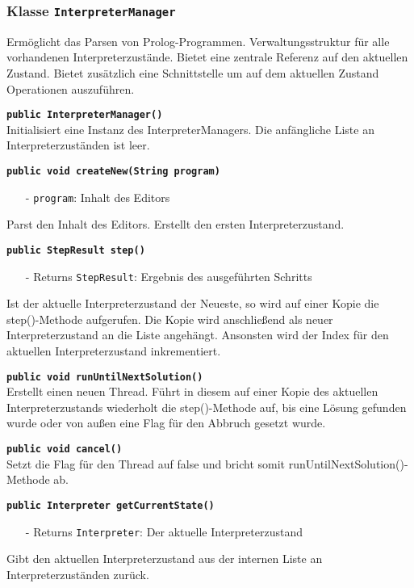 \documentclass[parskip=full,11pt,twoside]{scrartcl}
\begin{document}
\subsubsection{Klasse \texttt{InterpreterManager}}

Ermöglicht das Parsen von Prolog-Programmen. Verwaltungsstruktur für alle vorhandenen Interpreterzustände. Bietet eine zentrale Referenz auf den aktuellen Zustand. Bietet zusätzlich eine Schnittstelle um auf dem aktuellen Zustand Operationen auszuführen.

\textbf{\texttt{public InterpreterManager()}}\\
Initialisiert eine Instanz des InterpreterManagers. Die anfängliche Liste an Interpreterzuständen ist leer.

\textbf{\texttt{public void createNew(String program)}}
\begin{itemize}[noitemsep]
	\item[-] \texttt{program}: Inhalt des Editors
\end{itemize}
Parst den Inhalt des Editors. Erstellt den ersten Interpreterzustand.

\textbf{\texttt{public StepResult step()}}
\begin{itemize}[noitemsep]
    \item[-] Returns \texttt{StepResult}: Ergebnis des ausgeführten Schritts
\end{itemize}
Ist der aktuelle Interpreterzustand der Neueste, so wird auf einer Kopie die step()-Methode aufgerufen. Die Kopie wird anschließend als neuer Interpreterzustand an die Liste angehängt. Ansonsten wird der Index für den aktuellen Interpreterzustand inkrementiert.

\textbf{\texttt{public void runUntilNextSolution()}}\\
Erstellt einen neuen Thread. Führt in diesem auf einer Kopie des aktuellen Interpreterzustands wiederholt die step()-Methode auf, bis eine Lösung gefunden wurde oder von außen eine Flag für den Abbruch gesetzt wurde.

\textbf{\texttt{public void cancel()}}\\
Setzt die Flag für den Thread auf false und bricht somit runUntilNextSolution()-Methode ab. 

\textbf{\texttt{public Interpreter getCurrentState()}}
\begin{itemize}[noitemsep]
    \item[-] Returns \texttt{Interpreter}: Der aktuelle Interpreterzustand
\end{itemize}
Gibt den aktuellen Interpreterzustand aus der internen Liste an Interpreterzuständen zurück.
\end{document}
